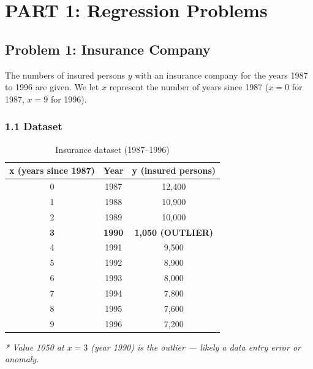 \documentclass[12pt,a4paper]{article}
\begin{document}
\section*{PART 1: Regression Problems}

\subsection*{Problem 1: Insurance Company}

The numbers of insured persons $y$ with an insurance company for the years 1987 to 1996
are given. We let $x$ represent the number of years since 1987 ($x=0$ for 1987,
$x=9$ for 1996).

\subsubsection*{1.1 Dataset}

\begin{table}[H]
\centering
\begin{tabular}{ccc}
\toprule
\textbf{x (years since 1987)} & \textbf{Year} & \textbf{y (insured persons)} \\
\midrule
0  & 1987 & 12,400 \\
1  & 1988 & 10,900 \\
2  & 1989 & 10,000 \\
\textbf{3}  & \textbf{1990} & \textbf{1,050 (OUTLIER)} \\
4  & 1991 & 9,500  \\
5  & 1992 & 8,900  \\
6  & 1993 & 8,000  \\
7  & 1994 & 7,800  \\
8  & 1995 & 7,600  \\
9  & 1996 & 7,200  \\
\bottomrule
\end{tabular}
\caption{Insurance dataset (1987--1996)}
\end{table}

\textit{* Value 1050 at $x=3$ (year 1990) is the outlier --- likely a data entry error or anomaly.}
\end{document}

